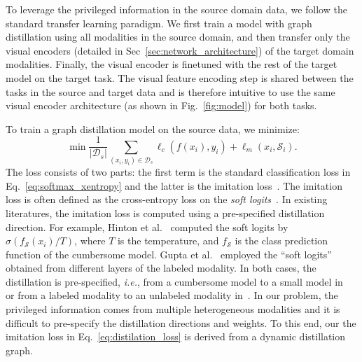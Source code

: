 To leverage the privileged information in the source domain data, we follow the standard transfer learning paradigm. We first train a model with graph distillation using all modalities in the source domain, and then transfer only the visual encoders (detailed in Sec~\ref{sec:network_architecture}) of the target domain modalities. Finally, the visual encoder is finetuned with the rest of the target model on the target task. The visual feature encoding step is shared between the tasks in the source and target data and is therefore intuitive to use the same visual encoder architecture (as shown in Fig.~\ref{fig:model}) for both tasks.

To train a graph distillation model on the source data, we minimize:
{\small
\begin{equation}
\label{eq:distilation_loss}
\min \frac{1}{|\mathcal{D}_{s}|} \sum_{(x_i, y_i) \in \mathcal{D}_{s}} \ell_c(f(x_i),y_i) + \ell_m(x_i, \mathcal{S}_i).
\end{equation}}The loss consists of two parts: the first term is the standard classification loss in Eq.~\eqref{eq:softmax_xentropy} and the latter is the imitation loss~\cite{distillation_hinton}. The imitation loss is often defined as the cross-entropy loss on the \emph{soft logits}~\cite{distillation_hinton}. In existing literatures, the imitation loss is computed using a pre-specified distillation direction. For example, Hinton et al.~\cite{distillation_hinton} computed the soft logits by $\sigma(f_{\mathcal{S}}(x_i)/T)$, where $T$ is the temperature, and $f_{\mathcal{S}}$ is the class prediction function of the cumbersome model. Gupta et al.~\cite{distillation_gupta} employed the ``soft logits'' obtained from different layers of the labeled modality. In both cases, the distillation is pre-specified, \textit{i.e.}, from a cumbersome model to a small model in~\cite{distillation_hinton} or from a labeled modality to an unlabeled modality in~\cite{distillation_gupta}. In our problem, 
the privileged information comes from multiple heterogeneous modalities and it is difficult to pre-specify the distillation directions and weights. To this end, our the imitation loss in Eq.~\eqref{eq:distilation_loss} is derived from a dynamic distillation graph.



